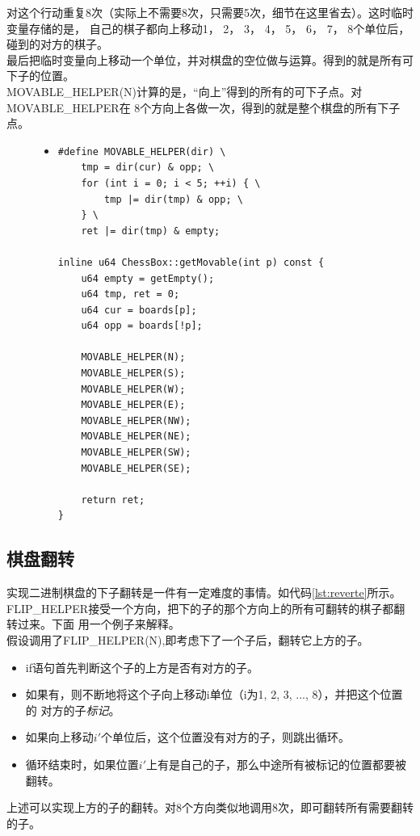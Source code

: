 \documentclass[a4paper]{article}
\begin{document}
对这个行动重复8次（实际上不需要8次，只需要5次，细节在这里省去）。这时临时变量存储的是，
自己的棋子都向上移动1， 2， 3， 4， 5， 6， 7， 8个单位后，碰到的对方的棋子。\\

最后把临时变量向上移动一个单位，并对棋盘的空位做与运算。得到的就是所有可下子的位置。\\

MOVABLE\_HELPER(N)计算的是，``向上''得到的所有的可下子点。对MOVABLE\_HELPER在
8个方向上各做一次，得到的就是整个棋盘的所有下子点。
\begin{figure}[!hbt]
\begin{itemize}
\item[] \begin{lstlisting}[style=mycpp, label=lst:movable, caption=得到可下子点的具体代码]
#define MOVABLE_HELPER(dir) \
    tmp = dir(cur) & opp; \
    for (int i = 0; i < 5; ++i) { \
        tmp |= dir(tmp) & opp; \
    } \
    ret |= dir(tmp) & empty;

inline u64 ChessBox::getMovable(int p) const {
    u64 empty = getEmpty();
    u64 tmp, ret = 0;
    u64 cur = boards[p];
    u64 opp = boards[!p];

    MOVABLE_HELPER(N);
    MOVABLE_HELPER(S);
    MOVABLE_HELPER(W);
    MOVABLE_HELPER(E);
    MOVABLE_HELPER(NW);
    MOVABLE_HELPER(NE);
    MOVABLE_HELPER(SW);
    MOVABLE_HELPER(SE);

    return ret;
}
\end{lstlisting}
\end{itemize}
\end{figure}

\subsection{棋盘翻转}
实现二进制棋盘的下子翻转是一件有一定难度的事情。如代码\autoref{lst:reverte}所示。\\

FLIP\_HELPER接受一个方向，把下的子的那个方向上的所有可翻转的棋子都翻转过来。下面
用一个例子来解释。\\

假设调用了FLIP\_HELPER(N),即考虑下了一个子后，翻转它上方的子。
\begin{itemize}
    \item if语句首先判断这个子的上方是否有对方的子。
    \item 如果有，则不断地将这个子向上移动i单位（i为1, 2, 3, ..., 8），并把这个位置的
对方的子\emph{标记}。
    \item 如果向上移动$i'$个单位后，这个位置没有对方的子，则跳出循环。
    \item 循环结束时，如果位置$i'$上有是自己的子，那么中途所有被标记的位置都要被翻转。
\end{itemize}
上述可以实现上方的子的翻转。对8个方向类似地调用8次，即可翻转所有需要翻转的子。
\end{document}
